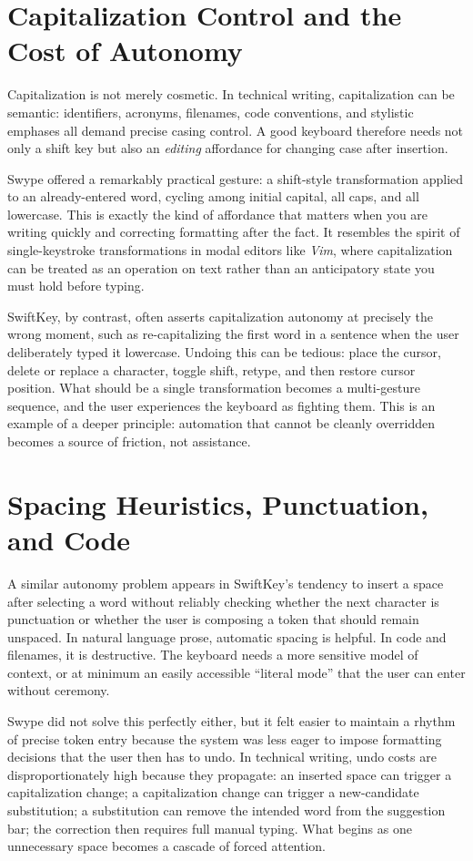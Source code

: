 \documentclass[11pt]{article}
\begin{document}
\section{Capitalization Control and the Cost of Autonomy}

Capitalization is not merely cosmetic. In technical writing, capitalization can be semantic: identifiers, acronyms, filenames, code conventions, and stylistic emphases all demand precise casing control. A good keyboard therefore needs not only a shift key but also an \emph{editing} affordance for changing case after insertion.

Swype offered a remarkably practical gesture: a shift-style transformation applied to an already-entered word, cycling among initial capital, all caps, and all lowercase. This is exactly the kind of affordance that matters when you are writing quickly and correcting formatting after the fact. It resembles the spirit of single-keystroke transformations in modal editors like \textit{Vim}, where capitalization can be treated as an operation on text rather than an anticipatory state you must hold before typing.

SwiftKey, by contrast, often asserts capitalization autonomy at precisely the wrong moment, such as re-capitalizing the first word in a sentence when the user deliberately typed it lowercase. Undoing this can be tedious: place the cursor, delete or replace a character, toggle shift, retype, and then restore cursor position. What should be a single transformation becomes a multi-gesture sequence, and the user experiences the keyboard as fighting them. This is an example of a deeper principle: automation that cannot be cleanly overridden becomes a source of friction, not assistance.

\section{Spacing Heuristics, Punctuation, and Code}

A similar autonomy problem appears in SwiftKey's tendency to insert a space after selecting a word without reliably checking whether the next character is punctuation or whether the user is composing a token that should remain unspaced. In natural language prose, automatic spacing is helpful. In code and filenames, it is destructive. The keyboard needs a more sensitive model of context, or at minimum an easily accessible ``literal mode'' that the user can enter without ceremony.

Swype did not solve this perfectly either, but it felt easier to maintain a rhythm of precise token entry because the system was less eager to impose formatting decisions that the user then has to undo. In technical writing, undo costs are disproportionately high because they propagate: an inserted space can trigger a capitalization change; a capitalization change can trigger a new-candidate substitution; a substitution can remove the intended word from the suggestion bar; the correction then requires full manual typing. What begins as one unnecessary space becomes a cascade of forced attention.
\end{document}
